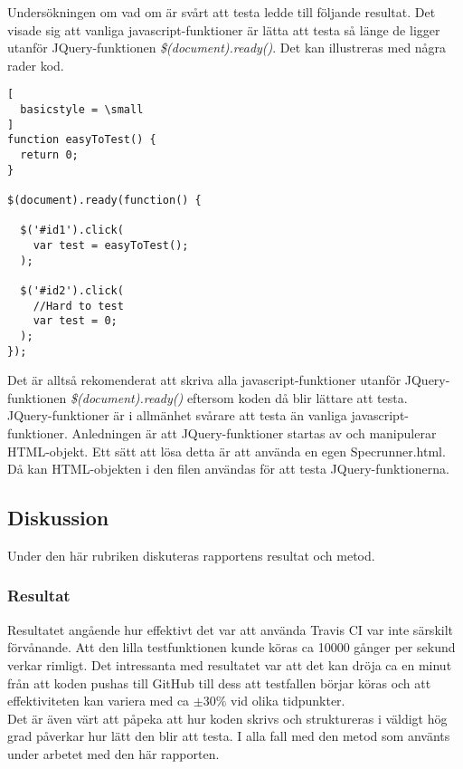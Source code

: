 Undersökningen om vad om är svårt att testa ledde till följande resultat.
Det visade sig att vanliga javascript-funktioner är lätta
att testa så länge de ligger utanför JQuery-funktionen
\emph{\$(document).ready()}. Det kan illustreras med några
rader kod.

\begin{lstlisting}[
  basicstyle = \small
]
function easyToTest() {
  return 0;
}

$(document).ready(function() {

  $('#id1').click(
    var test = easyToTest(); 
  );

  $('#id2').click(
    //Hard to test
    var test = 0; 
  );
});

\end{lstlisting}

Det är alltså rekomenderat att skriva alla javascript-funktioner utanför 
JQuery-funktionen \emph{\$(document).ready()} eftersom koden då blir 
lättare att testa.\\

JQuery-funktioner är i allmänhet svårare att testa än vanliga
javascript-funktioner. Anledningen är att JQuery-funktioner
startas av och manipulerar HTML-objekt. Ett sätt att lösa detta är
att använda en egen \textunderscore Specrunner.html. Då kan HTML-objekten i den
filen användas för att testa JQuery-funktionerna.

\subsection{Diskussion}
Under den här rubriken diskuteras rapportens resultat
och metod.

\subsubsection{Resultat}
Resultatet angående hur effektivt det var att använda Travis CI
var inte särskilt förvånande. Att den lilla testfunktionen kunde köras
ca 10000 gånger per sekund verkar rimligt. Det intressanta med resultatet
var att det kan dröja ca en minut från att koden pushas till GitHub
till dess att testfallen börjar köras och att effektiviteten
kan variera med ca $\pm 30 \%$ vid olika tidpunkter.\\

Det är även värt att påpeka att hur koden skrivs och struktureras
i väldigt hög grad påverkar hur lätt den blir att testa. I alla fall
med den metod som använts under arbetet med den här rapporten.

